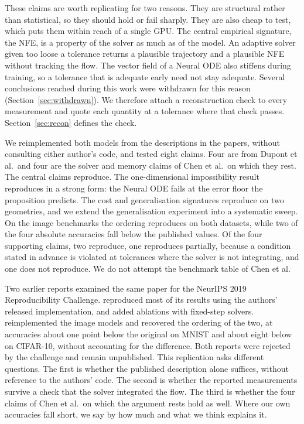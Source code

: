 These claims are worth replicating for two reasons. They are structural rather than
statistical, so they should hold or fail sharply. They are also cheap to test, which puts
them within reach of a single GPU. The central empirical signature, the NFE, is a property of
the solver as much as of the model. An adaptive solver given too loose a tolerance returns a
plausible trajectory and a plausible NFE without tracking the flow. The vector field of a
Neural ODE also stiffens during training, so a tolerance that is adequate early need not stay
adequate. Several conclusions reached during this work were withdrawn for this reason
(Section~\ref{sec:withdrawn}). We
therefore attach a reconstruction check to every measurement and quote each quantity at a
tolerance where that check passes. Section~\ref{sec:recon} defines the check.

We reimplemented both models from the descriptions in the papers, without consulting either
author's code, and tested eight claims. Four are from Dupont et al.\ and four are the solver
and memory claims of Chen et al.\ on which they rest. The central claims reproduce. The
one-dimensional impossibility result reproduces in a strong form: the Neural ODE fails at the
error floor the proposition predicts. The cost and generalisation signatures reproduce on two
geometries, and we extend the generalisation experiment into a systematic sweep. On the image
benchmarks the ordering reproduces on both datasets, while two of the four absolute
accuracies fall below the published values. Of the four supporting claims, two reproduce, one
reproduces partially, because a condition stated in advance is violated at tolerances where the
solver is not integrating, and one does not reproduce. We do not attempt the benchmark table of Chen
et al.

Two earlier reports examined the same paper for the NeurIPS 2019 Reproducibility Challenge.
\citet{lehnert2019reproducibility} reproduced most of its results using the authors' released
implementation, and added ablations with fixed-step solvers. \citet{ho2019reproducibility}
reimplemented the image models and recovered the ordering of the two, at accuracies about one
point below the original on MNIST and about eight below on CIFAR-10, without accounting for the
difference. Both reports were rejected by the challenge and remain unpublished. This replication
asks different questions. The first is whether the published description alone suffices, without
reference to the authors' code. The second is whether the reported measurements survive a check
that the solver integrated the flow. The third is whether the four claims of Chen et al.\ on
which the argument rests hold as well. Where our own accuracies fall short, we say by how much
and what we think explains it.

